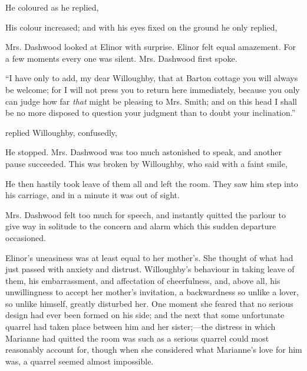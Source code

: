 


He coloured as he replied, 


His colour increased; and with his eyes fixed on the ground he only replied, 

Mrs. Dashwood looked at Elinor with surprise. Elinor felt equal amazement. For a few moments every one was silent. Mrs. Dashwood first spoke.

“I have only to add, my dear Willoughby, that at Barton cottage you will always be welcome; for I will not press you to return here immediately, because you only can judge how far {\em that} might be pleasing to Mrs. Smith; and on this head I shall be no more disposed to question your judgment than to doubt your inclination.”

 replied Willoughby, confusedly, 

He stopped. Mrs. Dashwood was too much astonished to speak, and another pause succeeded. This was broken by Willoughby, who said with a faint smile, 

He then hastily took leave of them all and left the room. They saw him step into his carriage, and in a minute it was out of sight.

Mrs. Dashwood felt too much for speech, and instantly quitted the parlour to give way in solitude to the concern and alarm which this sudden departure occasioned.

Elinor's uneasiness was at least equal to her mother's. She thought of what had just passed with anxiety and distrust. Willoughby's behaviour in taking leave of them, his embarrassment, and affectation of cheerfulness, and, above all, his unwillingness to accept her mother's invitation, a backwardness so unlike a lover, so unlike himself, greatly disturbed her. One moment she feared that no serious design had ever been formed on his side; and the next that some unfortunate quarrel had taken place between him and her sister;---the distress in which Marianne had quitted the room was such as a serious quarrel could most reasonably account for, though when she considered what Marianne's love for him was, a quarrel seemed almost impossible.


